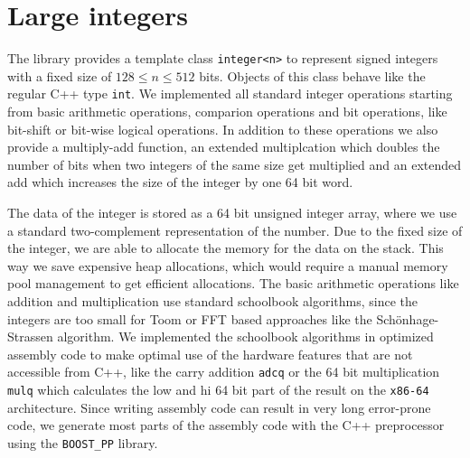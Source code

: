 \documentclass[oribibl,a4paper]{llncs2e/llncs}
\begin{document}

\section{Large integers}
The library provides a template class \verb|integer<n>| to represent signed integers with a fixed size of $128 \le n \le 512$ bits.
Objects of this class behave like the regular C++ type \verb|int|.
We implemented all standard integer operations starting from basic arithmetic operations, comparion operations and bit operations, like bit-shift or bit-wise logical operations.
In addition to these operations we also provide a multiply-add function, an extended multiplcation which doubles the number of bits when two integers of the same size get multiplied and an extended add which increases the size of the integer by one 64 bit word.

The data of the integer is stored as a 64 bit unsigned integer array, where we use a standard two-complement representation of the number.
Due to the fixed size of the integer, we are able to allocate the memory for the data on the stack.
This way we save expensive heap allocations, which would require a manual memory pool management to get efficient allocations.
The basic arithmetic operations like addition and multiplication use standard schoolbook algorithms, since the integers are too small for Toom\cite{Toom} or FFT based approaches like the Sch\"onhage-Strassen algorithm\cite{Schonhage}.
We implemented the schoolbook algorithms in optimized assembly code to make optimal use of the hardware features that are not accessible from C++, like the carry addition \verb|adcq| or the 64 bit multiplication \verb|mulq| which calculates the low and hi 64 bit part of the result on the \verb|x86-64| architecture.
Since writing assembly code can result in very long error-prone code, we generate most parts of the assembly code with the C++ preprocessor using the \verb|BOOST_PP| library.
\end{document}
